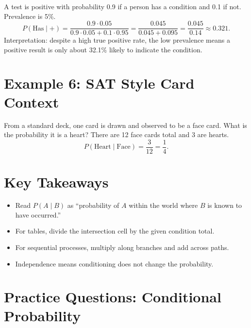 \documentclass[12pt]{article}
\begin{document}
A test is positive with probability 0.9 if a person has a condition and 0.1 if not. Prevalence is 5\%.  
\[
P(\text{Has}\mid +)=\frac{0.9\cdot0.05}{0.9\cdot0.05+0.1\cdot0.95}
=\frac{0.045}{0.045+0.095}=\frac{0.045}{0.14}\approx 0.321.
\]
Interpretation: despite a high true positive rate, the low prevalence means a positive result is only about 32.1\% likely to indicate the condition.

\section*{Example 6: SAT Style Card Context}

From a standard deck, one card is drawn and observed to be a face card. What is the probability it is a heart?  
There are 12 face cards total and 3 are hearts.  
\[
P(\text{Heart}\mid \text{Face})=\frac{3}{12}=\frac{1}{4}.
\]

\section*{Key Takeaways}
\begin{itemize}
  \item Read \(P(A\mid B)\) as “probability of \(A\) within the world where \(B\) is known to have occurred.”
  \item For tables, divide the intersection cell by the given condition total.
  \item For sequential processes, multiply along branches and add across paths.
  \item Independence means conditioning does not change the probability.
\end{itemize}

\newpage


\section*{Practice Questions: Conditional Probability}
\end{document}
